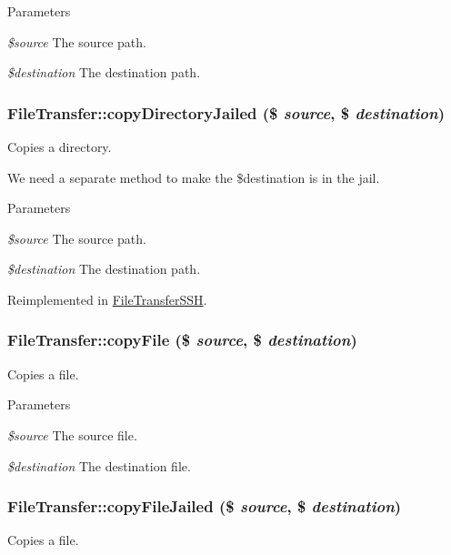 \begin{DoxyParams}{Parameters}
\item[{\em \$source}]The source path. \item[{\em \$destination}]The destination path. \end{DoxyParams}
\hypertarget{classFileTransfer_a004c3757d055356cbbb99d122a5d686c}{
\subsubsection[{copyDirectoryJailed}]{\setlength{\rightskip}{0pt plus 5cm}FileTransfer::copyDirectoryJailed (\$ {\em source}, \/  \$ {\em destination})}}
\label{classFileTransfer_a004c3757d055356cbbb99d122a5d686c}
Copies a directory.

We need a separate method to make the \$destination is in the jail.


\begin{DoxyParams}{Parameters}
\item[{\em \$source}]The source path. \item[{\em \$destination}]The destination path. \end{DoxyParams}


Reimplemented in \hyperlink{classFileTransferSSH_abf0f85befe3b628d7cc6543b23fed228}{FileTransferSSH}.\hypertarget{classFileTransfer_a8b2a75cd29bb8941663dc51da6a4550c}{
\subsubsection[{copyFile}]{\setlength{\rightskip}{0pt plus 5cm}FileTransfer::copyFile (\$ {\em source}, \/  \$ {\em destination})}}
\label{classFileTransfer_a8b2a75cd29bb8941663dc51da6a4550c}
Copies a file.


\begin{DoxyParams}{Parameters}
\item[{\em \$source}]The source file. \item[{\em \$destination}]The destination file. \end{DoxyParams}
\hypertarget{classFileTransfer_a9ca65dc0107476d044cf18c0873f4a90}{
\subsubsection[{copyFileJailed}]{\setlength{\rightskip}{0pt plus 5cm}FileTransfer::copyFileJailed (\$ {\em source}, \/  \$ {\em destination})}}
\label{classFileTransfer_a9ca65dc0107476d044cf18c0873f4a90}
Copies a file.


